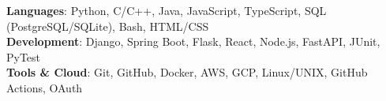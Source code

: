 \begin{itemize}[leftmargin=0.15in, label={}]
    \small{\item{
     \textbf{Languages}{: Python, C/C++, Java, JavaScript, TypeScript, SQL (PostgreSQL/SQLite), Bash, HTML/CSS} \\
     \textbf{Development}{: Django, Spring Boot, Flask, React, Node.js, FastAPI, JUnit, PyTest} \\
     \textbf{Tools \& Cloud}{: Git, GitHub, Docker, AWS, GCP, Linux/UNIX, GitHub Actions, OAuth} \\
    }}
\end{itemize}
